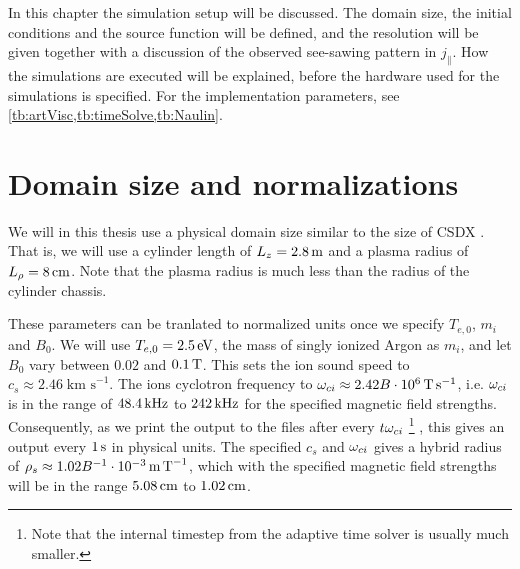 In this chapter the simulation setup will be discussed.
The domain size, the initial conditions and the source function will be defined, and the resolution will be given together with a discussion of the observed see-sawing pattern in $j_\|$.
How the simulations are executed will be explained, before the hardware used for the simulations is specified.
For the implementation parameters, see \cref{tb:artVisc,tb:timeSolve,tb:Naulin}.

\section{Domain size and normalizations}
%
We will in this thesis use a physical domain size similar to the size of CSDX \cite{Tynan2004a}.
That is, we will use a cylinder length of $L_z=2.8\, \text{m}$ and a plasma radius of $L_\rho=8\, \text{cm}$.
Note that the plasma radius is much less than the radius of the cylinder chassis.

These parameters can be tranlated to normalized units once we specify $T_{e,0}$, $m_i$ and $B_0$.
We will use $T_{e,0} = 2.5\, \text{eV}$, the mass of singly ionized Argon as $m_i$, and let $B_0$ vary between $0.02$ and $0.1 \, \text{T}$.
This sets the ion sound speed to $c_s \approx 2.46\; \text{km s}^{-1}$.
The ions cyclotron frequency to $\omega_{ci}\approx 2.42 B \cdot 10^6 \, \text{T}\, \text{s}^{-1}$, i.e. $\omega_{ci}$ is in the range of $48.4\, \text{kHz}$ to $242\, \text{kHz}$ for the specified magnetic field strengths.
Consequently, as we print the output to the files after every $t\omega_{ci}$ %
\footnote{Note that the internal timestep from the adaptive time solver is usually much smaller.}%
%
, this gives an output every $1\, \text{s}$ in physical units.
The specified $c_s$ and $\omega_{ci}$ gives a hybrid radius of $\rho_s \approx 1.02B^{-1}\cdot10^{-3}\, \text{m}\, \text{T}^{-1}$, which with the specified magnetic field strengths will be in the range $5.08\, \text{cm}$ to $1.02\, \text{cm}$.

